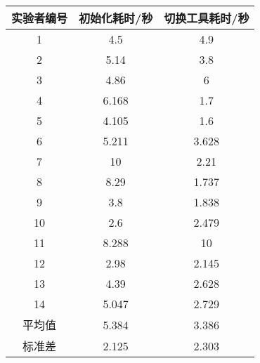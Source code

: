 \begin{table}[!hpb]
  \centering
  \begin{tabular}{@{}ccc@{}} \toprule
    实验者编号 & 初始化耗时/秒 & 切换工具耗时/秒\\
	\midrule
    1 & 4.5 & 4.9\\
	2 & 5.14 & 3.8\\
	3 & 4.86 & 6\\
	4 & 6.168 & 1.7\\
	5 & 4.105 & 1.6\\
	6 & 5.211 & 3.628\\
	7 & 10 & 2.21\\
	8 & 8.29 & 1.737\\
	9 & 3.8 & 1.838\\
	10 & 2.6 & 2.479\\
	11 & 8.288 & 10\\
	12 & 2.98 & 2.145\\
	13 & 4.39 & 2.628\\
	14 & 5.047 & 2.729\\
	平均值 & 5.384 & 3.386\\
	标准差 & 2.125 & 2.303\\
	\bottomrule
  \end{tabular}
\end{table}

